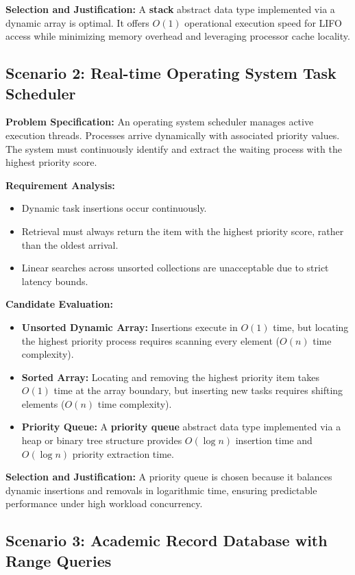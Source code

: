 \documentclass[12pt]{report}
\begin{document}
\textbf{Selection and Justification:} A \textbf{stack} abstract data type implemented via a dynamic array is optimal. It offers $O(1)$ operational execution speed for LIFO access while minimizing memory overhead and leveraging processor cache locality.

\subsection{Scenario 2: Real-time Operating System Task Scheduler}

\textbf{Problem Specification:} An operating system scheduler manages active execution threads. Processes arrive dynamically with associated priority values. The system must continuously identify and extract the waiting process with the highest priority score.

\textbf{Requirement Analysis:}
\begin{itemize}
    \item Dynamic task insertions occur continuously.
    \item Retrieval must always return the item with the highest priority score, rather than the oldest arrival.
    \item Linear searches across unsorted collections are unacceptable due to strict latency bounds.
\end{itemize}

\textbf{Candidate Evaluation:}
\begin{itemize}
    \item \textbf{Unsorted Dynamic Array:} Insertions execute in $O(1)$ time, but locating the highest priority process requires scanning every element ($O(n)$ time complexity).
    \item \textbf{Sorted Array:} Locating and removing the highest priority item takes $O(1)$ time at the array boundary, but inserting new tasks requires shifting elements ($O(n)$ time complexity).
    \item \textbf{Priority Queue:} A \textbf{priority queue} abstract data type implemented via a heap or binary tree structure provides $O(\log n)$ insertion time and $O(\log n)$ priority extraction time.
\end{itemize}

\textbf{Selection and Justification:} A priority queue is chosen because it balances dynamic insertions and removals in logarithmic time, ensuring predictable performance under high workload concurrency.

\subsection{Scenario 3: Academic Record Database with Range Queries}
\end{document}

